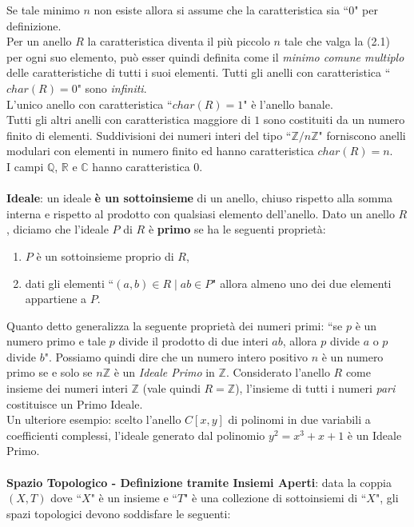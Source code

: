 \documentclass[a4paper,12pt]{tesiinfo}
\begin{document}
Se tale minimo $n$ non esiste allora si assume che la caratteristica sia ``0" per definizione.
\\
Per un anello $R$ la caratteristica diventa il pi\`u piccolo $n$ tale che valga la (2.1) per ogni suo elemento, pu\`o esser quindi definita come il \textit{minimo comune multiplo} delle caratteristiche di tutti i suoi elementi. 
Tutti gli anelli con caratteristica ``$char(R)=0$" sono \textit{infiniti}.
\\
L'unico anello con caratteristica ``$char(R)=1$" \`e l'anello banale.
\\
Tutti gli altri anelli con caratteristica maggiore di $1$ sono costituiti da un numero finito di elementi. Suddivisioni dei numeri interi del tipo ``$\mathbb{Z}/n\mathbb{Z}$" forniscono anelli modulari con elementi in numero finito ed hanno caratteristica $char(R) = n$.\\
I campi $\mathbb{Q}$, $\mathbb{R}$ e $\mathbb{C}$ hanno caratteristica $0$.
\\\\
%
%
%
\textbf{Ideale}: un ideale \textbf{\`e un sottoinsieme} di un anello, chiuso rispetto alla somma interna e rispetto al prodotto con qualsiasi elemento dell'anello.
Dato un anello $R$, diciamo che l'ideale $P$ di $R$ \`e \textbf{primo} se ha le seguenti propriet\`a:
\begin{enumerate}
  \item $P$ \`e un sottoinsieme proprio di $R$,
  \item dati gli elementi ``$(a, b) \in R \mid ab \in P$" allora almeno uno dei due elementi appartiene a $P$.
\end{enumerate}
Quanto detto generalizza la seguente propriet\`a dei numeri primi: ``se $p$ \`e un numero primo e tale $p$ divide il prodotto di due interi $ab$, allora $p$ divide $a$ o $p$ divide $b$". Possiamo quindi dire che un numero intero positivo $n$ \`e un numero primo se e solo se $n\mathbb{Z}$ \`e un \textit{Ideale Primo} in $\mathbb{Z}$. Considerato l'anello $R$ come insieme dei numeri interi $\mathbb{Z}$ (vale quindi $R = \mathbb{Z}$), l'insieme di tutti i numeri \textit{pari} costituisce un Primo Ideale.
\\
Un ulteriore esempio: scelto l'anello $C[x, y]$ di polinomi in due variabili a coefficienti complessi, l'ideale generato dal polinomio $y^2 = x^3 +x +1$ \`e un Ideale Primo.
\\\\
%
%
%
\textbf{Spazio Topologico - Definizione tramite Insiemi Aperti}: data la coppia $(X, T)$ dove ``$X$" \`e un insieme e ``$T$" \`e una collezione di sottoinsiemi di ``$X$", gli spazi topologici devono soddisfare le seguenti:
\end{document}

